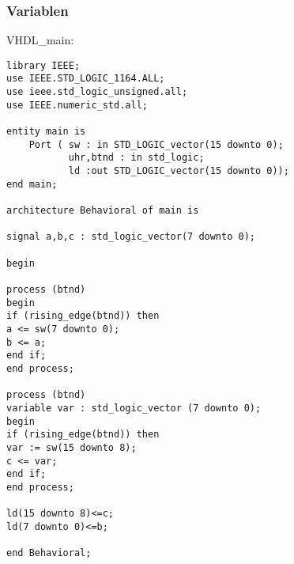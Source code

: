\documentclass{article}
\begin{document}
\subsubsection{Variablen}
VHDL\_main:\newline
\begin{verbatim}
library IEEE;
use IEEE.STD_LOGIC_1164.ALL;
use ieee.std_logic_unsigned.all;
use IEEE.numeric_std.all;

entity main is
    Port ( sw : in STD_LOGIC_vector(15 downto 0);
           uhr,btnd : in std_logic;
           ld :out STD_LOGIC_vector(15 downto 0));
end main;

architecture Behavioral of main is

signal a,b,c : std_logic_vector(7 downto 0);

begin

process (btnd)
begin
if (rising_edge(btnd)) then
a <= sw(7 downto 0);
b <= a;
end if;
end process;

process (btnd)
variable var : std_logic_vector (7 downto 0);
begin
if (rising_edge(btnd)) then
var := sw(15 downto 8);
c <= var;
end if;
end process;

ld(15 downto 8)<=c;
ld(7 downto 0)<=b;

end Behavioral;
\end{verbatim}
\end{document}
